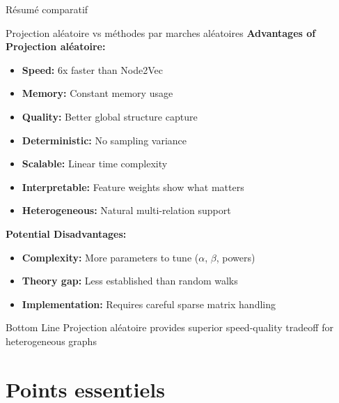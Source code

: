 \documentclass[9pt,aspectratio=169,professionalfonts]{beamer}
\providecommand{\checkmark}{\textbf{✓}}
\begin{document}
\begin{frame}{Résumé comparatif}
\begin{block}{Projection aléatoire vs méthodes par marches aléatoires}
\textbf{Advantages of Projection aléatoire:}
\begin{itemize}
    \item[\checkmark] \textbf{Speed:} 6x faster than Node2Vec
    \item[\checkmark] \textbf{Memory:} Constant memory usage
    \item[\checkmark] \textbf{Quality:} Better global structure capture
    \item[\checkmark] \textbf{Deterministic:} No sampling variance
    \item[\checkmark] \textbf{Scalable:} Linear time complexity
    \item[\checkmark] \textbf{Interpretable:} Feature weights show what matters
    \item[\checkmark] \textbf{Heterogeneous:} Natural multi-relation support
\end{itemize}

\textbf{Potential Disadvantages:}
\begin{itemize}
    \item[\textbf{!}] \textbf{Complexity:} More parameters to tune ($\alpha$, $\beta$, powers)
    \item[\textbf{!}] \textbf{Theory gap:} Less established than random walks
    \item[\textbf{!}] \textbf{Implementation:} Requires careful sparse matrix handling
\end{itemize}
\end{block}

\begin{alertblock}{Bottom Line}
Projection aléatoire provides superior speed-quality tradeoff for heterogeneous graphs
\end{alertblock}
\end{frame}

\section{Points essentiels}
\end{document}
